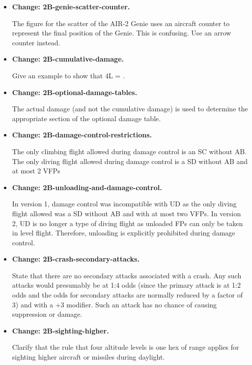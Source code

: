 \documentclass{report}
\newcommand{\changetag}[1]{\textbf{Change: #1.}\par}
\begin{document}
\begin{itemize}
        The figure for the scatter of the AIR-2 Genie is completed with a third panel showing the scatter when the target is at a hex center and facing a hex corner.

    \item\changetag{2B-genie-scatter-counter}

        The figure for the scatter of the AIR-2 Genie  uses an aircraft counter to represent the final position of the Genie. This is confusing. Use an arrow counter instead.

    \item\changetag{2B-cumulative-damage}

        Give an example to show that 4L = .

    \item\changetag{2B-optional-damage-tables}

        The actual damage (and not the cumulative damage) is used to determine the appropriate section of the optional damage table.

    \item\changetag{2B-damage-control-restrictions}

        The only climbing flight allowed during damage control is an SC without AB. The only diving flight allowed during damage control is a SD without AB and at most 2 VFPs

    \item\changetag{2B-unloading-and-damage-control}

        In version 1, damage control was incompatible with UD as the only diving flight allowed was a SD without AB and with at most two VFPs. In version 2, UD is no longer a type of diving flight as unloaded FPs can only be taken in level flight. Therefore, unloading is explicitly prohibited during damage control.

    \item\changetag{2B-crash-secondary-attacks}

        State that there are no secondary attacks associated with a crash. Any such attacks would presumably be at 1:4 odds (since the primary attack is at 1:2 odds and the odds for secondary attacks are normally reduced by a factor of 3) and with a +3 modifier. Such an attack has no chance of causing suppression or damage.

    \item\changetag{2B-sighting-higher}

        Clarify that the rule that four altitude levels is one hex of range applies for sighting higher aircraft or missiles during daylight.


\end{itemize}
\end{document}
